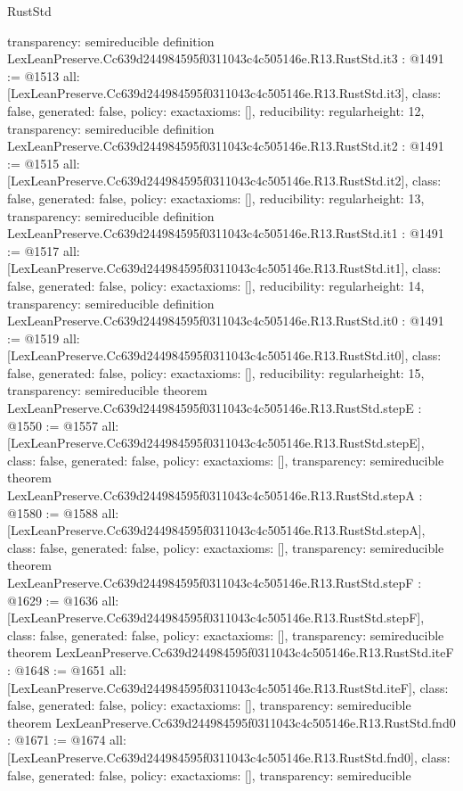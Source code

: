 \begin{lexlean}{RustStd}
\begin{coremodule}
{  transparency: semireducible
}
definition LexLeanPreserve.Cc639d244984595f0311043c4c505146e.R13.RustStd.it3 : @1491 := @1513 {
  all: [LexLeanPreserve.Cc639d244984595f0311043c4c505146e.R13.RustStd.it3],
  class: false,
  generated: false,
  policy: exact{axioms: []},
  reducibility: regular{height: 12},
  transparency: semireducible
}
definition LexLeanPreserve.Cc639d244984595f0311043c4c505146e.R13.RustStd.it2 : @1491 := @1515 {
  all: [LexLeanPreserve.Cc639d244984595f0311043c4c505146e.R13.RustStd.it2],
  class: false,
  generated: false,
  policy: exact{axioms: []},
  reducibility: regular{height: 13},
  transparency: semireducible
}
definition LexLeanPreserve.Cc639d244984595f0311043c4c505146e.R13.RustStd.it1 : @1491 := @1517 {
  all: [LexLeanPreserve.Cc639d244984595f0311043c4c505146e.R13.RustStd.it1],
  class: false,
  generated: false,
  policy: exact{axioms: []},
  reducibility: regular{height: 14},
  transparency: semireducible
}
definition LexLeanPreserve.Cc639d244984595f0311043c4c505146e.R13.RustStd.it0 : @1491 := @1519 {
  all: [LexLeanPreserve.Cc639d244984595f0311043c4c505146e.R13.RustStd.it0],
  class: false,
  generated: false,
  policy: exact{axioms: []},
  reducibility: regular{height: 15},
  transparency: semireducible
}
theorem LexLeanPreserve.Cc639d244984595f0311043c4c505146e.R13.RustStd.stepE : @1550 := @1557 {
  all: [LexLeanPreserve.Cc639d244984595f0311043c4c505146e.R13.RustStd.stepE],
  class: false,
  generated: false,
  policy: exact{axioms: []},
  transparency: semireducible
}
theorem LexLeanPreserve.Cc639d244984595f0311043c4c505146e.R13.RustStd.stepA : @1580 := @1588 {
  all: [LexLeanPreserve.Cc639d244984595f0311043c4c505146e.R13.RustStd.stepA],
  class: false,
  generated: false,
  policy: exact{axioms: []},
  transparency: semireducible
}
theorem LexLeanPreserve.Cc639d244984595f0311043c4c505146e.R13.RustStd.stepF : @1629 := @1636 {
  all: [LexLeanPreserve.Cc639d244984595f0311043c4c505146e.R13.RustStd.stepF],
  class: false,
  generated: false,
  policy: exact{axioms: []},
  transparency: semireducible
}
theorem LexLeanPreserve.Cc639d244984595f0311043c4c505146e.R13.RustStd.iteF : @1648 := @1651 {
  all: [LexLeanPreserve.Cc639d244984595f0311043c4c505146e.R13.RustStd.iteF],
  class: false,
  generated: false,
  policy: exact{axioms: []},
  transparency: semireducible
}
theorem LexLeanPreserve.Cc639d244984595f0311043c4c505146e.R13.RustStd.fnd0 : @1671 := @1674 {
  all: [LexLeanPreserve.Cc639d244984595f0311043c4c505146e.R13.RustStd.fnd0],
  class: false,
  generated: false,
  policy: exact{axioms: []},
  transparency: semireducible
}
\end{coremodule}
\end{lexlean}
